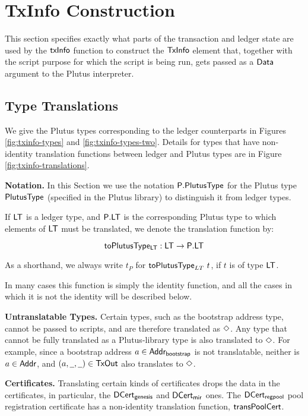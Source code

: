 \section{TxInfo Construction}
\label{sec:txinfo}

This section specifies exactly what parts of the transaction and ledger
state are used by the $\mathsf{txInfo}$ function to construct the
$\mathsf{TxInfo}$ element that, together with the script purpose for which the script
is being run, gets passed as a $\mathsf{Data}$ argument to the Plutus interpreter.

\subsection{Type Translations}

We give the Plutus types corresponding to the ledger counterparts in Figures \ref{fig:txinfo-types}
and \ref{fig:txinfo-types-two}. Details for types that have non-identity translation
functions between ledger and Plutus types are in Figure \ref{fig:txinfo-translations}.

\textbf{Notation. }
In this Section we use the notation $\mathsf{P.PlutusType}$ for the Plutus type
$\mathsf{PlutusType}$ (specified in the Plutus library) to distinguish it from ledger types.

If $\mathsf{LT}$ is a ledger type, and $\mathsf{P.LT}$ is the corresponding Plutus type to
which elements of $\mathsf{LT}$ must be translated, we denote the
translation function by:

\[ \mathsf{toPlutusType_{LT}} : \mathsf{LT} \to \mathsf{P.LT} \]

As a shorthand, we always write $t_P$ for $\mathsf{toPlutusType}_{LT}~t$, if $t$ is of type $\mathsf{LT}$.

In many cases this function is simply the identity function, and all
the cases in which it is not the identity will be described below.

\textbf{Untranslatable Types. }
Certain types, such as the bootstrap address type, cannot be passed to scripts, and
are therefore translated as $\Diamond$. Any type that cannot be fully translated
as a Plutus-library type is also translated to $\Diamond$.
For example, since a bootstrap address $a \in \mathsf{Addr_{bootstrap}}$
is not translatable, neither is $a\in\mathsf{Addr}$, and $(a,\wcard,\wcard) \in \TxOut$
also translates to $\Diamond$.

\textbf{Certificates. }
Translating certain kinds of certificates drops the data in the
certificates, in particular, the $\mathsf{DCert_{genesis}}$ and $\mathsf{DCert_{mir}}$ ones.
The $\mathsf{DCert_{regpool}}$ pool registration certificate has a non-identity translation function,
$\mathsf{transPoolCert}$.

